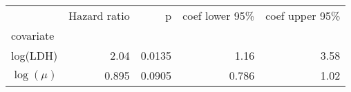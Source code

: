 \begin{tabular}{lrrrr}
\toprule
{} &  Hazard ratio &      p &  coef lower 95\% &  coef upper 95\% \\
covariate   &               &        &                  &                  \\
\midrule
log(LDH)    &          2.04 & 0.0135 &             1.16 &             3.58 \\
$\log(\mu)$ &         0.895 & 0.0905 &            0.786 &             1.02 \\
\bottomrule
\end{tabular}
